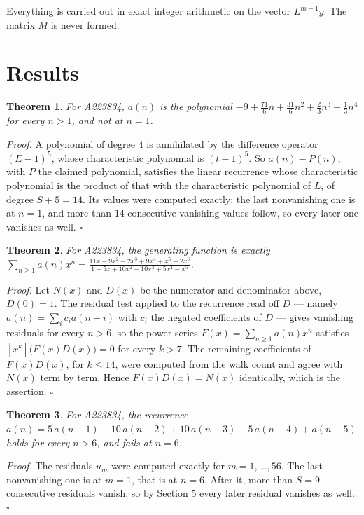\documentclass[11pt]{article}
\newtheorem{theorem}{Theorem}
\theoremstyle{definition}
\begin{document}
Everything is carried out in exact integer arithmetic on the vector $L^{m-1}y$. The matrix $M$ is never formed.

\section{Results}

\begin{theorem} For A223834, $a(n)$ is the polynomial $-9 + \frac{71}{6}n + \frac{31}{6}n^{2} + \frac{2}{3}n^{3} + \frac{1}{3}n^{4}$ for every $n > 1$, and not at $n = 1$.\end{theorem}

{\itshape Proof.} A polynomial of degree $4$ is annihilated by the difference operator $(E-1)^{5}$, whose characteristic polynomial is $(t-1)^{5}$. So $a(n) - P(n)$, with $P$ the claimed polynomial, satisfies the linear recurrence whose characteristic polynomial is the product of that with the characteristic polynomial of $L$, of degree $S + 5 = 14$. Its values were computed exactly; the last nonvanishing one is at $n = 1$, and more than $14$ consecutive vanishing values follow, so every later one vanishes as well. $\square$

\begin{theorem} For A223834, the generating function is exactly $\sum_{n\ge 1} a(n)x^n = \frac{11x - 9x^{2} - 2x^{3} + 9x^{4} + x^{5} - 2x^{6}}{1 - 5x + 10x^{2} - 10x^{3} + 5x^{4} - x^{5}}$.\end{theorem}

{\itshape Proof.} Let $N(x)$ and $D(x)$ be the numerator and denominator above, $D(0)=1$. The residual test applied to the recurrence read off $D$ --- namely $a(n) = \sum_i c_i a(n-i)$ with $c_i$ the negated coefficients of $D$ --- gives vanishing residuals for every $n > 6$, so the power series $F(x)=\sum_{n\ge 1}a(n)x^n$ satisfies $[x^k]\bigl(F(x)D(x)\bigr) = 0$ for every $k > 7$. The remaining coefficients of $F(x)D(x)$, for $k \le 14$, were computed from the walk count and agree with $N(x)$ term by term. Hence $F(x)D(x) = N(x)$ identically, which is the assertion. $\square$

\begin{theorem} For A223834, the recurrence $a(n) = 5\,a(n-1) - 10\,a(n-2) + 10\,a(n-3) - 5\,a(n-4) + a(n-5)$ holds for every $n > 6$, and fails at $n = 6$.\end{theorem}

{\itshape Proof.} The residuals $u_m$ were computed exactly for $m = 1,\dots,56$. The last nonvanishing one is at $m = 1$, that is at $n = 6$. After it, more than $S = 9$ consecutive residuals vanish, so by Section 5 every later residual vanishes as well. $\square$
\end{document}
